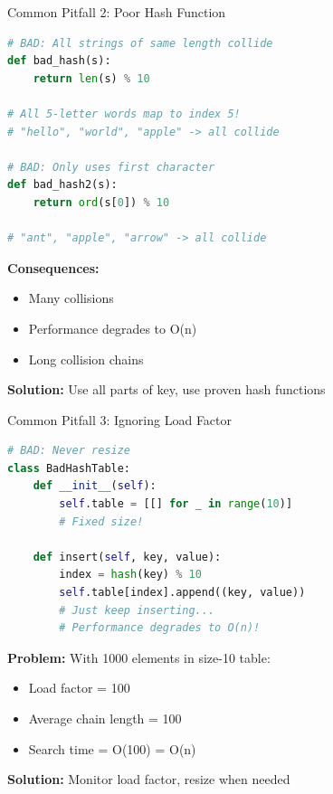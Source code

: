 \documentclass[aspectratio=169]{beamer}
\begin{document}
\begin{frame}[fragile]{Common Pitfall 2: Poor Hash Function}
  \begin{lstlisting}[language=Python, basicstyle=\ttfamily\small]
# BAD: All strings of same length collide
def bad_hash(s):
    return len(s) % 10

# All 5-letter words map to index 5!
# "hello", "world", "apple" -> all collide

# BAD: Only uses first character
def bad_hash2(s):
    return ord(s[0]) % 10

# "ant", "apple", "arrow" -> all collide
  \end{lstlisting}

  \vspace{0.3cm}
  \textbf{Consequences:}
  \begin{itemize}
    \item Many collisions
    \item Performance degrades to O(n)
    \item Long collision chains
  \end{itemize}

  \vspace{0.3cm}
  \textbf{Solution:} Use all parts of key, use proven hash functions
\end{frame}

\begin{frame}[fragile]{Common Pitfall 3: Ignoring Load Factor}
  \begin{lstlisting}[language=Python, basicstyle=\ttfamily\small]
# BAD: Never resize
class BadHashTable:
    def __init__(self):
        self.table = [[] for _ in range(10)]
        # Fixed size!

    def insert(self, key, value):
        index = hash(key) % 10
        self.table[index].append((key, value))
        # Just keep inserting...
        # Performance degrades to O(n)!
  \end{lstlisting}

  \vspace{0.3cm}
  \textbf{Problem:} With 1000 elements in size-10 table:
  \begin{itemize}
    \item Load factor = 100
    \item Average chain length = 100
    \item Search time = O(100) = O(n)
  \end{itemize}

  \vspace{0.3cm}
  \textbf{Solution:} Monitor load factor, resize when needed
\end{frame}
\end{document}
